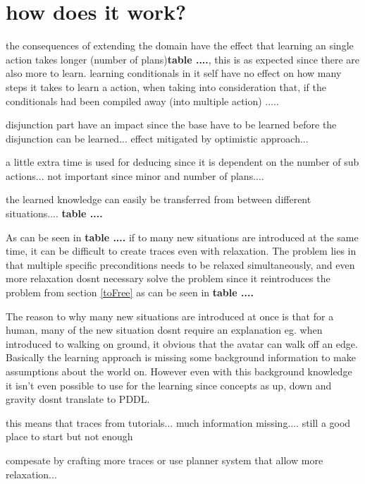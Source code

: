 	
\section{how does it work?}	
	the consequences of extending the domain have the effect that learning an single action takes longer (number of plans)\textbf{table ....}, this is as expected since there are also more to learn. learning conditionals in it self have no effect on how many steps it takes to learn a action, when taking into consideration that, if the conditionals had been compiled away (into multiple action) .....
	
	disjunction part have an impact since the base have to be learned before the disjunction can be learned... effect mitigated by optimistic approach... 
	
	a little extra time is used for deducing since it is dependent on the number of sub actions... not important since minor and number of plans....
	
	
	the learned knowledge can easily be transferred from between different situations.... \textbf{table ....}
	
	As can be seen in \textbf{table ....} if to many new situations are introduced at the same time, it can be difficult to create traces even with relaxation. The problem lies in that multiple specific preconditions needs to be relaxed simultaneously, and even more relaxation dosnt necessary solve the problem since it reintroduces the problem from section \ref{toFree} as can be seen in \textbf{table ....}
	
	The reason to why many new situations are introduced at once is that for a human, many of the new situation dosnt require an explanation eg. when introduced to walking on ground, it obvious that the avatar can walk off an edge. Basically the learning approach is missing some background information to make assumptions about the world on. However even with this background knowledge it isn't even possible to use for the learning since concepts as up, down and gravity dosnt translate to PDDL. 
	 
	 this means that traces from tutorials... much information missing.... still a good place to start but not enough
	 
	 compesate by crafting more traces or use planner system that allow more relaxation...
	
	
